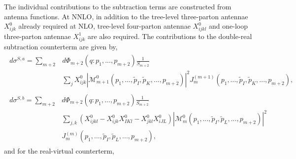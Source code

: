The individual contributions to the subtraction terms are constructed from
antenna functions. At NNLO, in addition to the tree-level three-parton antennae
$X_{ijk}^0$ already required at NLO, tree-level four-parton antennae $X_{ijkl}^0$
and one-loop three-parton antennae $X_{ijk}^1$ are also required. The
contributions to the double-real subtraction counterterm are given by,
\begin{equation}
    \begin{gathered}
        \begin{aligned}
            d\sigma^{S,a} = \sum_{m+2}&d\Phi_{m+2}(q:p_1,...,p_{m+2})\frac1{S_{m+2}}\\
                                      &\sum_j X_{ijk}^0|\mathcal M_{m+1}^0(p_1,...,\tilde p_I,\tilde p_K,...,p_{m+2})|^2J_m^{(m+1)}(p_1,...,\tilde p_I,\tilde p_K,...,p_{m+2}),
        \end{aligned}\\
        \begin{aligned}
            d\sigma^{S,b} = \sum_{m+2}&d\Phi_{m+2}(q:p_1,...,p_{m+2})\frac1{S_{m+2}}\\
                                      &\sum_{j,k}\left(X_{ijkl}^0-X_{ijk}^0X_{IKl}^0-X_{jkl}^0X_{iJL}^0\right)|\mathcal M_m^0(p_1,...,\tilde p_I,\tilde p_L,...,p_{m+2})|^2\\
                                      & J_m^{(m)}(p_1,...,\tilde p_I,\tilde p_L,...,p_{m+2}),
        \end{aligned}
    \end{gathered}
\end{equation}
and for the real-virtual counterterm,
